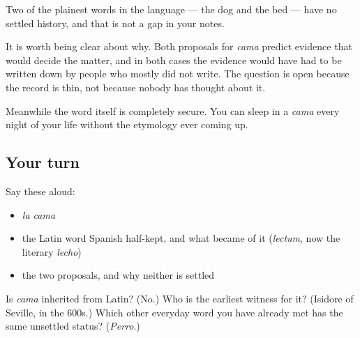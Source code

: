 \begin{grammarlens}[title={What you've built}]
Two of the plainest words in the language — the dog and the bed — have no settled history, and that is not a gap in your notes.

It is worth being clear about why. Both proposals for \emph{cama} predict evidence that would decide the matter, and in both cases the evidence would have had to be written down by people who mostly did not write. The question is open because the record is thin, not because nobody has thought about it.

Meanwhile the word itself is completely secure. You can sleep in a \emph{cama} every night of your life without the etymology ever coming up.
\end{grammarlens}

\subsection*{Your turn}
Say these aloud:

\begin{itemize}
\raggedright
  \item \emph{la cama}
  \item the Latin word Spanish half-kept, and what became of it (\emph{lectum}, now the literary \emph{lecho})
  \item the two proposals, and why neither is settled
\end{itemize}

\begin{tcolorbox}[breakable,colback=teal!4,colframe=teal!35!black,title={Before you move on}]
Is \emph{cama} inherited from Latin? (No.) Who is the earliest witness for it? (Isidore of Seville, in the 600s.) Which other everyday word you have already met has the same unsettled status? (\emph{Perro}.)
\end{tcolorbox}
